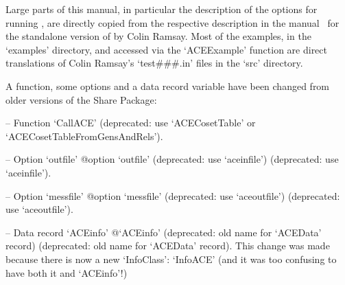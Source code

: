 \enditems


Large parts of this manual,  in  particular  the  description  of  the
options for running {\ACE}, are directly copied  from  the  respective
description in the manual~\cite{Ram99} for the standalone  version  of
{\ACE} by Colin Ramsay.  Most  of  the  examples,  in  the  `examples'
directory, and accessed  via  the  `ACEExample'  function  are  direct
translations  of  Colin  Ramsay's `test\#\#\#.in' files  in  the `src'
directory.


A function, some options and a data record variable have been changed
from older versions of the {\ACE} Share Package:

\beginlist

\item{--} Function   `CallACE'{\undoquotes{}}  (deprecated:  use
`ACECosetTable' or `ACECosetTableFromGensAndRels').

\item{--} Option     `outfile'{\undoquotes{}
{@option `outfile' (deprecated: use  `aceinfile')}}  (deprecated:  use
`aceinfile').

\item{--} Option    `messfile'{\undoquotes{}
{@option `messfile' (deprecated: use `aceoutfile')}} (deprecated:  use
`aceoutfile').

\item{--} Data      record      `ACEinfo'{\undoquotes{}
{@`ACEinfo' (deprecated: old name for `ACEData' record)}} (deprecated:
old name for `ACEData' record). This change was made because there  is
now a new `InfoClass': `InfoACE' (and it was  too  confusing  to  have
both it and `ACEinfo'!)

\endlist

